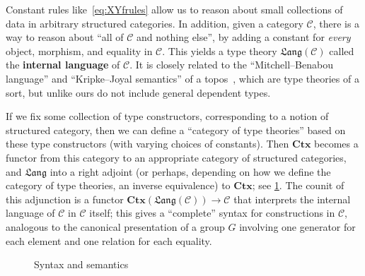 \documentclass[10pt]{article}
\def\m#1{\llbracket#1\rrbracket}
\def\C{\mathscr{C}}
\def\Ctx{\mathbf{Ctx}}
\def\Lang{\mathfrak{Lang}}
\numberwithin{equation}{section}
\begin{document}
Constant rules like~\eqref{eq:XYfrules} allow us to reason about small collections of data in arbitrary structured categories.
In addition, given a category $\C$, there is a way to reason about ``all of $\C$ and nothing else'', by adding a constant for \emph{every} object, morphism, and equality in $\C$.
This yields a type theory $\Lang(\C)$ called the \textbf{internal language} of $\C$.
It is closely related to the ``Mitchell--Benabou language'' and ``Kripke--Joyal semantics'' of a topos~\cite{mm:shv-gl,ptj:elephant,bell:topos-lst,goldblatt:topoi}, which are type theories of a sort, but unlike ours do not include general dependent types.

If we fix some collection of type constructors, corresponding to a notion of structured category, then we can define a ``category of type theories'' based on these type constructors (with varying choices of constants).
Then $\Ctx$ becomes a functor from this category to an appropriate category of structured categories, and $\Lang$ into a right adjoint (or perhaps, depending on how we define the category of type theories, an inverse equivalence) to $\Ctx$; see \cref{fig:internal-logic}.
The counit of this adjunction is a functor $\Ctx(\Lang(\C)) \to \C$ that interprets the internal language of $\C$ in $\C$ itself; this gives a ``complete'' syntax for constructions in $\C$, analogous to the canonical presentation of a group $G$ involving one generator for each element and one relation for each equality.

\begin{figure}
  \centering
  \caption{Syntax and semantics}
  \label{fig:internal-logic}
\end{figure}
\end{document}

